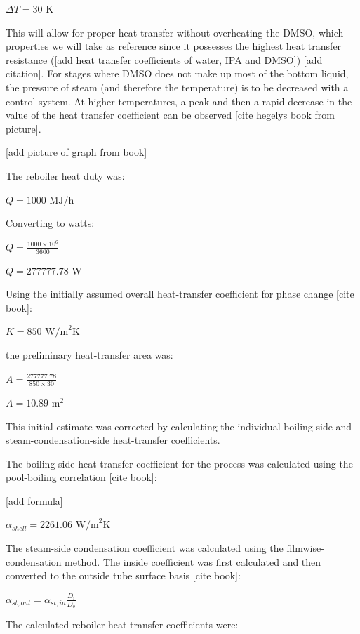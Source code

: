 \(\Delta T = 30 \text{ K}\)

This will allow for proper heat transfer without overheating the DMSO,
which properties we will take as reference since it possesses the
highest heat transfer resistance ({[}add heat transfer coefficients of
water, IPA and DMSO{]}) {[}add citation{]}. For stages where DMSO does
not make up most of the bottom liquid, the pressure of steam (and
therefore the temperature) is to be decreased with a control system. At
higher temperatures, a peak and then a rapid decrease in the value of
the heat transfer coefficient can be observed {[}cite hegelys book from
picture{]}.

{[}add picture of graph from book{]}

The reboiler heat duty was:

\(Q = 1000 \text{ MJ/h}\)

Converting to watts:

\(Q = \frac{1000 \times 10^6}{3600}\)

\(Q = 277777.78 \text{ W}\)

Using the initially assumed overall heat-transfer coefficient for phase
change {[}cite book{]}:

\(K = 850 \text{ W/m}^2\text{K}\)

the preliminary heat-transfer area was:

\(A = \frac{277777.78}{850 \times 30}\)

\(A = 10.89 \text{ m}^2\)

This initial estimate was corrected by calculating the individual
boiling-side and steam-condensation-side heat-transfer coefficients.

The boiling-side heat-transfer coefficient for the process was
calculated using the pool-boiling correlation {[}cite book{]}:

{[}add formula{]}

\(\alpha_{shell} = 2261.06 \text{ W/m}^2\text{K}\)

The steam-side condensation coefficient was calculated using the
filmwise-condensation method. The inside coefficient was first
calculated and then converted to the outside tube surface basis {[}cite
book{]}:

\(\alpha_{st,out} = \alpha_{st,in} \frac{D_i}{D_o}\)

The calculated reboiler heat-transfer coefficients were:

